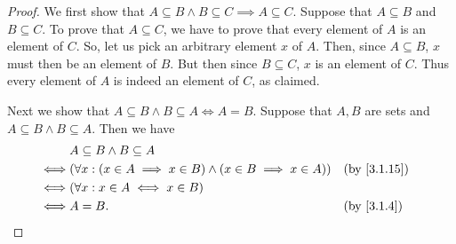 \begin{proof}
  We first show that \(A \subseteq B \land B \subseteq C \implies A \subseteq C\).
  Suppose that \(A \subseteq B\) and \(B \subseteq C\).
  To prove that \(A \subseteq C\), we have to prove that every element of \(A\) is an element of \(C\).
  So, let us pick an arbitrary element \(x\) of \(A\).
  Then, since \(A \subseteq B\), \(x\) must then be an element of \(B\).
  But then since \(B \subseteq C\), \(x\) is an element of \(C\).
  Thus every element of \(A\) is indeed an element of \(C\), as claimed.

  Next we show that \(A \subseteq B \land B \subseteq A \iff A = B\).
  Suppose that \(A, B\) are sets and \(A \subseteq B \land B \subseteq A\).
  Then we have
  \begin{align*}
         & A \subseteq B \land B \subseteq A                                                          \\
    \iff & (\forall x : (x \in A \implies x \in B) \land (x \in B \implies x \in A)) &  & \by{3.1.15} \\
    \iff & (\forall x : x \in A \iff x \in B)                                                         \\
    \iff & A = B.                                                                    &  & \by{3.1.4}
  \end{align*}


\end{proof}
